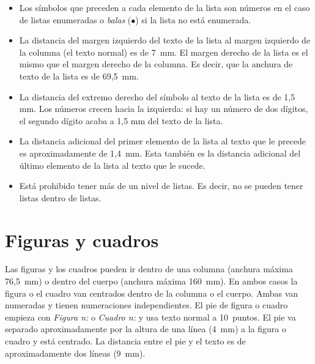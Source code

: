 \documentclass[twocolumn,twoside,a4paper, 10pt]{article}
\begin{document}
\begin{itemize}
	\item Los símbolos que preceden a cada elemento de la lista son 
	números en el caso de listas enumeradas o \emph{balas} 
	($\bullet$) si la lista no está enumerada.
	
	\item La distancia del margen izquierdo del texto de la lista al
	margen izquierdo de la columna (el texto normal) es de 7~mm.  El
	margen derecho de la lista es el mismo que el margen derecho de la
	columna. Es decir, que la anchura de texto de la lista es de 69,5~mm.
	
	\item La distancia del extremo derecho del símbolo al texto de la 
	lista es de 1,5 mm. Los números crecen hacia la izquierda: si hay 
	un número de dos dígitos, el segundo dígito acaba a 1,5 mm del 
	texto de la lista.
	
	\item La distancia adicional del primer elemento de la lista al texto que 
	le precede es aproximadamente de 1,4~mm. Esta también es la distancia adicional del último 
	elemento de la lista al texto que le sucede.
	
	\item Está prohibido tener más de un nivel de 
	listas. Es decir, no se pueden tener listas dentro de listas.
\end{itemize}

\section{Figuras y cuadros}

Las figuras y los cuadros pueden ir dentro de una columna (anchura 
máxima 76,5~mm) o dentro del cuerpo (anchura máxima 160~mm). En ambos 
casos la figura o el cuadro van centrados dentro de la columna o el 
cuerpo. Ambas van numeradas y tienen numeraciones independientes. El 
pie de figura o cuadro empieza con \emph{Figura n:} o \emph{Cuadro 
n:} y usa texto normal a 10~puntos. El pie  va separado 
aproximadamente por la altura de una línea (4~mm) a la figura o 
cuadro y está centrado. La distancia entre el pie y el texto es de 
aproximadamente dos líneas (9~mm).

\end{document}
